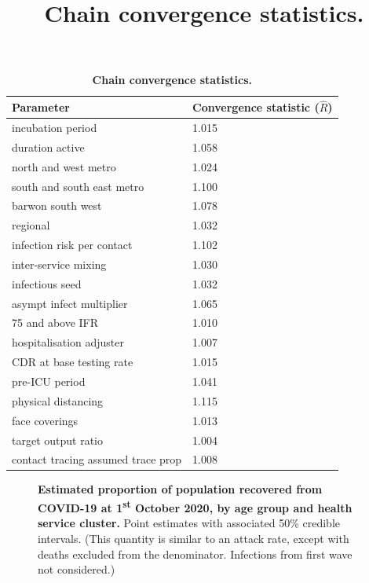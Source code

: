 \begin{table}[ht]
\renewcommand{\baselinestretch}{1}
	\begin{tabular}[ht]{| p{7cm} | p{6cm} |}
	\hline
		\textbf{Parameter} & \textbf{Convergence statistic} (\(\hat{R}\)) \\
		
\hline incubation period & 1.015 \\

\hline duration active & 1.058 \\

\hline north and west metro & 1.024 \\

\hline south and south east metro & 1.100 \\

\hline barwon south west & 1.078 \\

\hline regional & 1.032 \\

\hline infection risk per contact & 1.102 \\

\hline inter-service mixing & 1.030 \\

\hline infectious seed & 1.032 \\

\hline asympt infect multiplier & 1.065 \\

\hline 75 and above IFR & 1.010 \\

\hline hospitalisation adjuster & 1.007 \\

\hline CDR at base testing rate & 1.015 \\

\hline pre-ICU period & 1.041 \\

\hline physical distancing & 1.115 \\

\hline face coverings & 1.013 \\

\hline target output ratio & 1.004 \\

\hline contact tracing assumed trace prop & 1.008 \\

	\hline
    \end{tabular}
    \title{Chain convergence statistics.}
    \caption{\textbf{Chain convergence statistics.}}	
    \label{tab:convergence}
\end{table}


\begin{figure}[ht]
    \caption{\textbf{Estimated proportion of population recovered from COVID-19 at 1\textsuperscript{st} October 2020, by age group and health service cluster.} Point estimates with associated 50\% credible intervals. (This quantity is similar to an attack rate, except with deaths excluded from the denominator. Infections from first wave not considered.)}
\end{figure}
